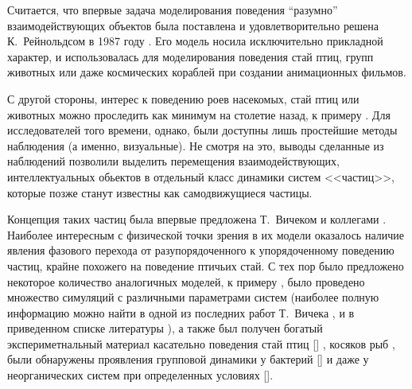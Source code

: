 
Считается, что впервые задача моделирования поведения ``разумно'' взаимодействующих объектов была поставлена и удовлетворительно решена К.~Рейнольдсом в 1987 году \cite{reynolds1987}. Его модель носила исключительно прикладной характер, и использовалась для моделирования поведения стай птиц, групп животных или даже космических кораблей при создании анимационных фильмов.

С другой стороны, интерес к поведению роев насекомых, стай птиц или животных можно проследить как минимум на столетие назад, к примеру \cite{selous1931}. Для исследователей того времени, однако, были доступны лишь простейшие методы наблюдения (а именно, визуальные). Не смотря на это, выводы сделанные из наблюдений позволили выделить перемещения взаимодействующих, интеллектуальных обьектов в отдельный класс динамики систем <<частиц>>, которые позже станут известны как самодвижущиеся частицы.%

Концепция таких частиц была впервые предложена Т.~Вичеком и коллегами \cite{vicsek1995}. Наиболее интересным с физической точки зрения в их модели оказалось наличие явления фазового перехода от разупорядоченного к упорядоченному поведению частиц, крайне похожего на поведение птичьих стай.
С тех пор было предложено некоторое количество аналогичных моделей, к примеру \cite{gregoire2004,schubring2013,kuemmel2013,huepe2008,chate2008,tu2000}, было проведено множество симуляций с различными параметрами систем (наиболее полную информацию можно найти в одной из последних работ Т.~Вичека \cite{vicsek2012}, и в приведенном списке литературы %
), а также был получен богатый экспериметнальный материал касательно поведения стай птиц [] %
, косяков рыб \cite{cambui2012}, были обнаружены проявления групповой динамики у бактерий [] и даже у неорганических систем при определенных условиях [].